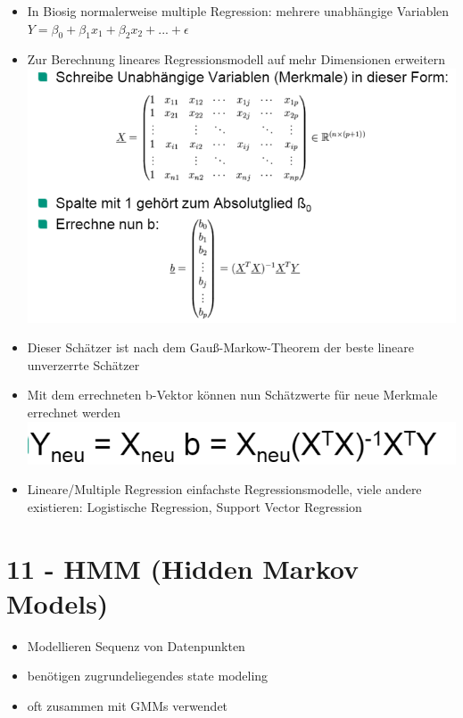 \documentclass[a4paper,10pt,oneside]{article}
\begin{document}
\begin{itemize}
	\item In Biosig normalerweise multiple Regression: mehrere unabhängige Variablen $Y=\beta_0+\beta_1x_1+\beta_2x_2+...+\epsilon$
	\item Zur Berechnung lineares Regressionsmodell auf mehr Dimensionen erweitern
	\includegraphics[scale=0.65]{Grafiken/multipreg.png}
	\item Dieser Schätzer ist nach dem Gauß-Markow-Theorem der beste lineare unverzerrte Schätzer
	\item Mit dem errechneten b-Vektor können nun Schätzwerte für neue Merkmale errechnet werden 
	\includegraphics[scale=0.65]{Grafiken/neuemerkmale.png}
	\item Lineare/Multiple Regression einfachste Regressionsmodelle, viele andere existieren: Logistische Regression, Support Vector Regression
\end{itemize}








\section{11 - HMM (Hidden Markov Models)}
	\begin{itemize}
		\item Modellieren Sequenz von Datenpunkten
		\item benötigen zugrundeliegendes state modeling
		\item oft zusammen mit GMMs verwendet
	\end{itemize}
	
\end{document}
